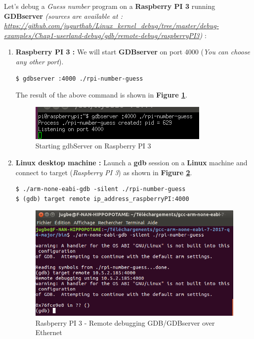 	


Let's debug a \og \emph{Guess number} \fg program on a \textbf{Raspberry PI 3} running \textbf{GDBserver} \emph{(sources are available at : {\color{blue} \url{https://github.com/jugurthab/Linux_kernel_debug/tree/master/debug-examples/Chap1-userland-debug/gdb/remote-debug/raspberryPI3}})} : 
\begin{enumerate}
	\item \textbf{Raspberry PI 3 : } We will start \textbf{GDBserver} on port 4000 (\emph{You can choose any other port}).
	\begin{lstlisting}[style=BashInputStyle]
$ gdbserver :4000 ./rpi-number-guess
    \end{lstlisting}

The result of the above command is shown in \textbf{Figure \ref{Starting gdbServer on Raspberry PI 3}}.
\begin{figure}[H]
		\centering
        \includegraphics[scale=0.45]{img/solution/starting-ethernet-gdbserver-session-rp3.png}
        \caption{Starting gdbServer on Raspberry PI 3}
        \label{Starting gdbServer on Raspberry PI 3}
    \end{figure}



	\item \textbf{Linux desktop machine :} Launch a \textbf{gdb} session on a \textbf{Linux} machine and connect to target (\emph{Raspberry PI 3}) as shown in \textbf{Figure \ref{Rasbperry PI 3 - Remote debugging GDB/GDBserver over Ethernet}}.
		\begin{lstlisting}[style=BashInputStyle]
$ ./arm-none-eabi-gdb -silent ./rpi-number-guess
$ (gdb) target remote ip_address_raspberryPI:4000	
    \end{lstlisting}
	
\begin{figure}[H]
		\centering
        \includegraphics[scale=0.33]{img/solution/gdb-server-ethernet.png}
        \caption{Rasbperry PI 3 - Remote debugging GDB/GDBserver over Ethernet}
        \label{Rasbperry PI 3 - Remote debugging GDB/GDBserver over Ethernet}
    \end{figure}	
	

\end{enumerate}
